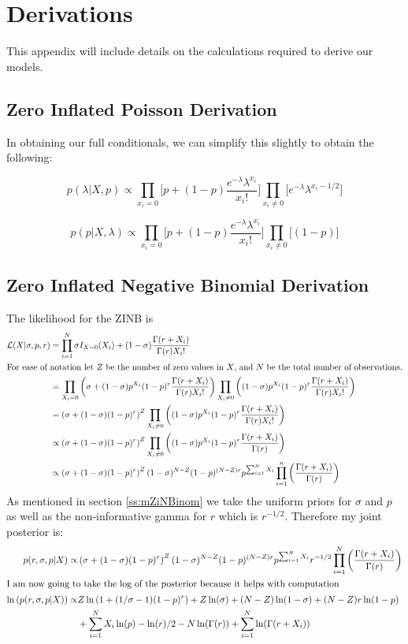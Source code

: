 \documentclass{article}\usepackage[]{graphicx}\usepackage[]{color}
\begin{document}
\section{Derivations}
\label{a:derivation}
This appendix will include details on the calculations required to derive our models.
\subsection{Zero Inflated Poisson Derivation}
\label{a:dZIP}
\noindent In obtaining our full conditionals, we can simplify this slightly to obtain the following:

\[
p(\lambda|X, p) \propto \prod_{x_i=0}\bigg[p+(1-p)\frac{e^{-\lambda}\lambda^{x_i}}{x_i!}\bigg]\prod_{x_i \ne 0}\bigg[e^{-\lambda}\lambda^{x_i - 1/2}\bigg]
\]

\[
p(p|X, \lambda) \propto \prod_{x_i=0}\bigg[p+(1-p)\frac{e^{-\lambda}\lambda^{x_i}}{x_i!}\bigg]\prod_{x_i \ne 0}\bigg[(1-p)\bigg]
\]
\subsection{Zero Inflated Negative Binomial Derivation}
\label{a:dZINB}
The likelihood for the ZINB is 
\begin{align*}
\mathcal{L}(X|\sigma, p, r) &= \prod_{i=1}^N \sigma I_{X=0}(X_i) + (1-\sigma)\frac{\Gamma(r+X_i)}{\Gamma(r)X_i!}\\
\intertext{For ease of notation let $Z$ be the number of zero values in $X$, and $N$ be the total number of observations.}
&=\prod_{X_i=0}\left(\sigma + (1-\sigma)p^{X_i}(1-p)^r\frac{\Gamma(r+X_i)}{\Gamma(r)X_i!}\right)\prod_{X_i\ne 0}\left((1-\sigma)p^{X_i}(1-p)^r\frac{\Gamma(r+X_i)}{\Gamma(r)X_i!}\right)\\
&=\left(\sigma + (1-\sigma)(1-p)^r\right)^Z\prod_{X_i\ne 0}\left((1-\sigma)p^{X_i}(1-p)^r\frac{\Gamma(r+X_i)}{\Gamma(r)X_i!}\right)\\
&\propto\left(\sigma + (1-\sigma)(1-p)^r\right)^Z\prod_{X_i\ne 0}\left((1-\sigma)p^{X_i}(1-p)^r\frac{\Gamma(r+X_i)}{\Gamma(r)}\right)\\
&\propto\left(\sigma + (1-\sigma)(1-p)^r\right)^Z(1-\sigma)^{N-Z}(1-p)^{(N-Z)r}p^{\sum_{i=1}^NX_i}\prod_{i=1}^n\left(\frac{\Gamma(r+X_i)}{\Gamma(r)}\right)
\end{align*}
As mentioned in section \ref{ss:mZiNBinom} we take the uniform priors for $\sigma$ and $p$ as well as the non-informative gamma for $r$ which is $r^{-1/2}$. Therefore my joint posterior is:
\begin{align*}
p(r,\sigma, p|X)\propto&\left(\sigma + (1-\sigma)(1-p)^r\right)^Z(1-\sigma)^{N-Z}(1-p)^{(N-Z)r}p^{\sum_{i=1}^NX_i}r^{-1/2}\prod_{i=1}^N\left(\frac{\Gamma(r+X_i)}{\Gamma(r)}\right)\\
\intertext{I am now going to take the log of the posterior because it helps with computation}
\ln\left(p(r,\sigma, p|X)\right)\propto&Z\ln\left(1 + (1/\sigma-1)(1-p)^r\right) + Z\ln(\sigma) + (N-Z)\ln(1-\sigma)+(N-Z)r\ln(1-p)\\
&+\sum_{i=1}^NX_i\ln(p)-\ln(r)/2-N\ln(\Gamma(r))+\sum_{i=1}^N\ln(\Gamma(r+X_i))
\end{align*}
\end{document}
